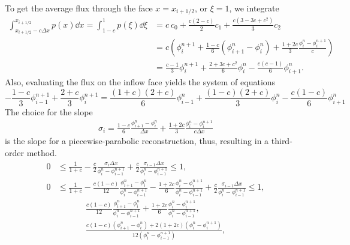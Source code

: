 \documentclass[../thesis.tex]{subfiles}
\begin{document}
To get the average flux through the face \(x = x_{i+1/2}\), or \(\xi = 1\), we integrate
\begin{equation}
    \begin{split}
        \int_{x_{i+1/2}-c\Delta x}^{x_{i+1/2}} p(x) \dd{x}
        =
        \int_{1-c}^{1} p(\xi) \dd{\xi}
        &= c~c_0 + \frac{c(2-c)}{2}c_1 + \frac{c(3-3c+c^2)}{3}c_2
        \\
        &=c \left( \phi_{i}^{n+1}
        +\frac{1-c}{6}\left( \phi_{i+1}^{n}-\phi_{i}^{n} \right)
        +\frac{1+2c}{3}
        \frac{\phi_{i}^{n}-\phi_{i}^{n+1}}{c} \right)
        \\
        &= \frac{c-1}{3}\phi_{i}^{n+1}
        +\frac{2+3c+c^2}{6}\phi_{i}^{n}
        -\frac{c(c-1)}{6}\phi_{i+1}^{n}.
    \end{split}
\end{equation}
Also, evaluating the flux on the inflow face yields the system of equations
\begin{equation}
    -\frac{1-c}{3}\phi_{i-1}^{n+1}
    +\frac{2+c}{3}\phi_{i}^{n+1}
    =
    \frac{(1+c)(2+c)}{6}\phi_{i-1}^{n}
    +\frac{(1-c)(2+c)}{3}\phi_{i}^{n}
    -\frac{c(1-c)}{6}\phi_{i+1}^{n}
\end{equation}
The choice for the slope
\begin{equation}
    \begin{split}
        \sigma_{i} = \frac{1-c}{6}
        \frac{\phi_{i+1}^{n} - \phi_{i}^{n}}
        {\Delta x}
        + \frac{1+2c}{3}
        \frac{\phi_{i}^{n} - \phi_{i}^{n+1}}
        {c \Delta x}
    \end{split}
\end{equation}
is the slope for a piecewise-parabolic reconstruction, thus, resulting in a third-order method.
\begin{equation}
    \begin{split}
        0
        &\leq
        \frac{1}{1+c}
        -\frac{c}{2}
        \frac{\sigma_{i}\Delta x}
        {\phi_{i}^{n} - \phi_{i-1}^{n+1}}
        +\frac{c}{2}
        \frac{\sigma_{i-1}\Delta x}
        {\phi_{i}^{n} - \phi_{i-1}^{n+1}}
        \leq
        1,
        \\
        0
        &\leq
        \frac{1}{1+c}
        -\frac{c(1-c)}{12}
        \frac{\phi_{i+1}^{n} - \phi_{i}^{n}}
        {\phi_{i}^{n} - \phi_{i-1}^{n+1}}
        -\frac{1+2c}{6}
        \frac{\phi_{i}^{n} - \phi_{i}^{n+1}}
        {\phi_{i}^{n} - \phi_{i-1}^{n+1}}
        +\frac{c}{2}
        \frac{\sigma_{i-1}\Delta x}
        {\phi_{i}^{n} - \phi_{i-1}^{n+1}}
        \leq
        1,
    \end{split}
\end{equation}
\begin{equation}
    \begin{split}
        \frac{c(1-c)}{12}
        \frac{\phi_{i+1}^{n} - \phi_{i}^{n}}
        {\phi_{i}^{n} - \phi_{i-1}^{n+1}}
        +\frac{1+2c}{6}
        \frac{\phi_{i}^{n} - \phi_{i}^{n+1}}
        {\phi_{i}^{n} - \phi_{i-1}^{n+1}},
        \\
        \frac{c(1-c)(\phi_{i+1}^{n} - \phi_{i}^{n})
        + 2(1+2c)(\phi_{i}^{n} - \phi_{i}^{n+1})}
        {12(\phi_{i}^{n} - \phi_{i-1}^{n+1})},
    \end{split}
\end{equation}
\end{document}

